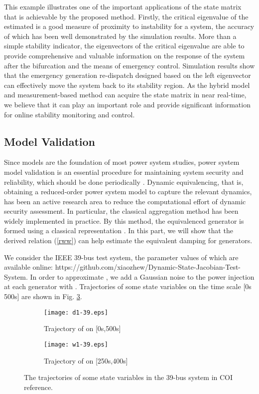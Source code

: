 \documentclass[journal]{IEEEtran}
\begin{document}
This example illustrates one of the important applications of the state matrix that is achievable by the proposed method. Firstly, the critical eigenvalue of the estimated  is a good measure of proximity to instability for a system, the accuracy of which has been well demonstrated by the simulation results. More than a simple stability indicator, the eigenvectors of the critical eigenvalue are able to provide comprehensive and valuable information on the response of the system after the bifurcation and the means of emergency control. Simulation results show that the emergency generation re-dispatch designed based on the left eigenvector can effectively move the system back to its stability region. As the hybrid model and measurement-based method can acquire the state matrix in near real-time, we believe that it can play an important role and provide significant information for online stability monitoring and control.

\subsection{Model Validation}
Since models are the foundation of most power system studies, power system model validation is an essential procedure for maintaining system security and reliability, which should be done periodically \cite{Bialek:2014}\cite{Pourbeik:2010}. Dynamic equivalencing, that is, obtaining a reduced-order power system model to capture the relevant dynamics, has been an active research area to reduce the computational effort of dynamic security assessment. In particular, the classical aggregation method has been widely implemented in practice. By this method, the equivalenced generator is formed using a classical representation \cite{Vittal:2013}. In this part, we will show that the derived relation (\ref{rww}) can help estimate the equivalent damping  for generators.

We consider the IEEE 39-bus test system, the parameter values of which are available online: https://github.com/xiaozhew/Dynamic-State-Jacobian-Test-System. In order to approximate , we add a Gaussian noise to the power injection at each generator with . Trajectories of some state variables on the time scale [0s 500s] are shown in Fig. \ref{39-modelvalidation}.

\begin{figure}[!ht]
\centering
\begin{subfigure}[t]{0.5\linewidth}
\texttt{[image: d1-39.eps]}
\caption{Trajectory of  on [0s,500s]}\label{d1-39}
\end{subfigure}\begin{subfigure}[t]{0.5\linewidth}
\texttt{[image: w1-39.eps]}
\caption{Trajectory of  on [250s,400s]}\label{w1-39}
\end{subfigure}
\caption{The trajectories of some state variables in the 39-bus system in COI reference.}\label{39-modelvalidation}
\end{figure}
\end{document}
